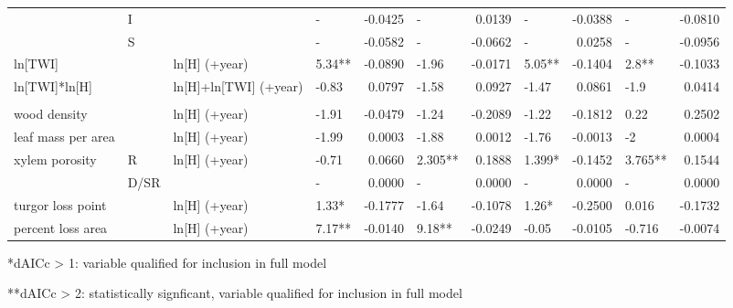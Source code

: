 \documentclass[
]{article}
\begin{document}
\begin{table}[!h]
{\begin{tabular}[t]{llllrlrlrlr}
\hspace{1em} & I &  & - & -0.0425 & - & 0.0139 & - & -0.0388 & - & -0.0810\\
\hspace{1em} & S &  & - & -0.0582 & - & -0.0662 & - & 0.0258 & - & -0.0956\\
\hspace{1em}ln[TWI] &  & ln[H] (+year) & 5.34** & -0.0890 & -1.96 & -0.0171 & 5.05** & -0.1404 & 2.8** & -0.1033\\
\hspace{1em}ln[TWI]*ln[H] &  & ln[H]+ln[TWI] (+year) & -0.83 & 0.0797 & -1.58 & 0.0927 & -1.47 & 0.0861 & -1.9 & 0.0414\\
\addlinespace[1em]
\multicolumn{1}{l}{\textbf{Species traits}}\\
\hspace{1em}wood density &  & ln[H] (+year) & -1.91 & -0.0479 & -1.24 & -0.2089 & -1.22 & -0.1812 & 0.22 & 0.2502\\
\hspace{1em}leaf mass per area &  & ln[H] (+year) & -1.99 & 0.0003 & -1.88 & 0.0012 & -1.76 & -0.0013 & -2 & 0.0004\\
\hspace{1em}xylem porosity & R & ln[H] (+year) & -0.71 & 0.0660 & 2.305** & 0.1888 & 1.399* & -0.1452 & 3.765** & 0.1544\\
\hspace{1em} & D/SR &  & - & 0.0000 & - & 0.0000 & - & 0.0000 & - & 0.0000\\
\hspace{1em}turgor loss point &  & ln[H] (+year) & 1.33* & -0.1777 & -1.64 & -0.1078 & 1.26* & -0.2500 & 0.016 & -0.1732\\
\hspace{1em}percent loss area &  & ln[H] (+year) & 7.17** & -0.0140 & 9.18** & -0.0249 & -0.05 & -0.0105 & -0.716 & -0.0074\\
\bottomrule
\end{tabular}}
\end{table}

*dAICc \textgreater{} 1: variable qualified for inclusion in full model

**dAICc \textgreater{} 2: statistically signficant, variable qualified
for inclusion in full model
\end{document}
